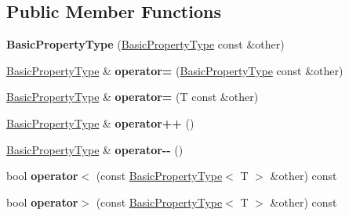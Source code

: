 \subsection*{Public Member Functions}
\begin{DoxyCompactItemize}
\item 
\hypertarget{classBasicPropertyType_a9d967556ec7106be014ef360e8ad729c}{{\bfseries Basic\-Property\-Type} (\hyperlink{classBasicPropertyType}{Basic\-Property\-Type} const \&other)}\label{classBasicPropertyType_a9d967556ec7106be014ef360e8ad729c}

\item 
\hypertarget{classBasicPropertyType_adf19305750a4f3aaf605ae2b18353e32}{\hyperlink{classBasicPropertyType}{Basic\-Property\-Type} \& {\bfseries operator=} (\hyperlink{classBasicPropertyType}{Basic\-Property\-Type} const \&other)}\label{classBasicPropertyType_adf19305750a4f3aaf605ae2b18353e32}

\item 
\hypertarget{classBasicPropertyType_a993468c37a7ac66e8897c3477404301f}{\hyperlink{classBasicPropertyType}{Basic\-Property\-Type} \& {\bfseries operator=} (T const \&other)}\label{classBasicPropertyType_a993468c37a7ac66e8897c3477404301f}

\item 
\hypertarget{classBasicPropertyType_ad01cb6c2ae97f0b4b9d57cbca77077ee}{\hyperlink{classBasicPropertyType}{Basic\-Property\-Type} \& {\bfseries operator++} ()}\label{classBasicPropertyType_ad01cb6c2ae97f0b4b9d57cbca77077ee}

\item 
\hypertarget{classBasicPropertyType_a1ff6ae706f6d093f43165a6f00268dee}{\hyperlink{classBasicPropertyType}{Basic\-Property\-Type} \& {\bfseries operator-\/-\/} ()}\label{classBasicPropertyType_a1ff6ae706f6d093f43165a6f00268dee}

\item 
\hypertarget{classBasicPropertyType_ae2a1d3c9885b05c9d022d1a01e28888e}{bool {\bfseries operator$<$} (const \hyperlink{classBasicPropertyType}{Basic\-Property\-Type}$<$ T $>$ \&other) const }\label{classBasicPropertyType_ae2a1d3c9885b05c9d022d1a01e28888e}

\item 
\hypertarget{classBasicPropertyType_a6cb6f98a17ae2ae19c94643de930a73c}{bool {\bfseries operator$>$} (const \hyperlink{classBasicPropertyType}{Basic\-Property\-Type}$<$ T $>$ \&other) const }\label{classBasicPropertyType_a6cb6f98a17ae2ae19c94643de930a73c}


\end{DoxyCompactItemize}
